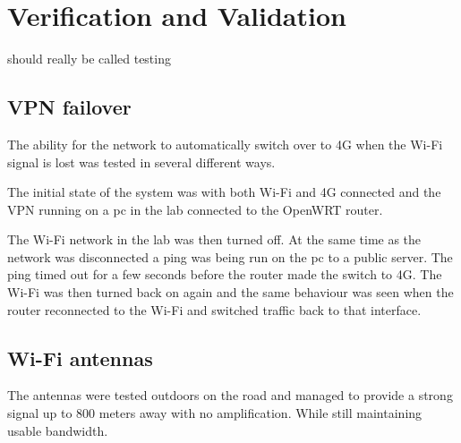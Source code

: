 \section{Verification and Validation}
should really be called testing

\subsection{VPN failover}
The ability for the network to automatically switch over to 4G when the Wi-Fi signal is lost was tested in several different ways.

The initial state of the system was with both Wi-Fi and 4G connected and the VPN running on a pc in the lab connected to the OpenWRT router.

The Wi-Fi network in the lab was then turned off. At the same time as the network was disconnected a ping was being run on the pc to a public server. The ping timed out for a few seconds before the router made the switch to 4G. The Wi-Fi was then turned back on again and the same behaviour was seen when the router reconnected to the Wi-Fi and switched traffic back to that interface.

\subsection{Wi-Fi antennas}
The antennas were tested outdoors on the road and managed to provide a strong signal up to 800 meters away with no amplification. While still maintaining usable bandwidth.